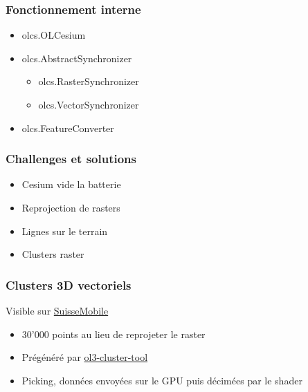 \documentclass{beamer}
\begin{document}
   \begin{frame}
    \frametitle{Fonctionnement interne}
    \begin{itemize}
      \item olcs.OLCesium
        \pause
      \item olcs.AbstractSynchronizer
        \begin{itemize}
          \item olcs.RasterSynchronizer
          \item olcs.VectorSynchronizer
        \end{itemize}
        \pause
      \item olcs.FeatureConverter
    \end{itemize}
  \end{frame}


  \begin{frame}
    \frametitle{Challenges et solutions}
    \begin{itemize}
      \item Cesium vide la batterie
        \pause
      \item Reprojection de rasters
        \pause
      \item Lignes sur le terrain
        \pause
      \item Clusters raster
     \end{itemize}
  \end{frame}

  \begin{frame}
    \frametitle{Clusters 3D vectoriels}
    Visible sur \href{https://map.schweizmobil.ch/?cesium&trackId=2149217&layers=Train}{SuisseMobile}
    \begin{itemize}
      \item 30'000 points au lieu de reprojeter le raster
      \item Prégénéré par \href{https://github.com/gberaudo/ol3-cluster-tool}{ol3-cluster-tool}
      \item Picking, données envoyées sur le GPU puis décimées par le shader
    \end{itemize}
  \end{frame}
\end{document}
